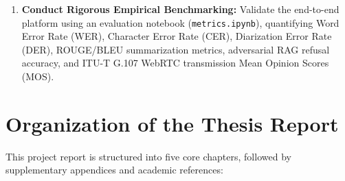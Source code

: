 \documentclass[12pt,oneside,letterpaper]{report}
\numberwithin{equation}{chapter} %
\begin{document}
\begin{enumerate}
    \item \textbf{Conduct Rigorous Empirical Benchmarking:} Validate the end-to-end platform using an evaluation notebook (\texttt{metrics.ipynb}), quantifying Word Error Rate (WER), Character Error Rate (CER), Diarization Error Rate (DER), ROUGE/BLEU summarization metrics, adversarial RAG refusal accuracy, and ITU-T G.107 WebRTC transmission Mean Opinion Scores (MOS).
\end{enumerate}

\section{Organization of the Thesis Report}
This project report is structured into five core chapters, followed by supplementary appendices and academic references:
\end{document}
